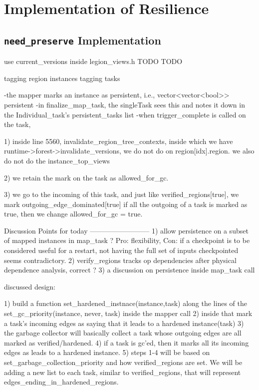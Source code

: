 \section{Implementation of Resilience}

\subsection{\texttt{need\_preserve} Implementation}

use current\_versions inside legion\_views.h TODO TODO

tagging region instances
tagging tasks

-the mapper marks an instance as persistent, i.e., vector<vector<bool>> persistent
-in finalize\_map\_task, the singleTask sees this and notes it down in the Individual\_task's persistent\_tasks list
-when trigger\_complete is called on the task, 

	1) inside line 5560, invalidate\_region\_tree\_contexts, 
		inside which we have runtime->forest->invalidate\_versions, we do not do on region[idx].region.
		we also do not do the instance\_top\_views
		
	2) we retain the mark on the task as allowed\_for\_gc.

   3) we go to the incoming of this task, and just like verified\_regions[true], we mark outgoing\_edge\_dominated[true]
      if all the outgoing of a task is marked as true, then we change allowed\_for\_gc = true.


Discussion Points for today
--------------------------
1) allow persistence on a subset of mapped instances in map\_task ? Pro:
flexibility, Con: if a checkpoint is to be considered useful for a restart, not
having the full set of inputs checkpointed seems contradictory. 
2) verify\_regions tracks op dependencies after physical dependence analysis, correct ? 
3) a discussion on persistence inside map\_task call 


discussed design:

1) build a function set\_hardened\_instnace(instance,task) along the lines of the set\_gc\_priority(instance, never, task) inside the mapper call
2) inside that mark a task's incoming edges as saying that it leads to a hardened instance(task)
3) the garbage collector will basically collect a task whose outgoing edges are all marked as verified/hardened.
4) if a task is gc'ed, then it marks all its incoming edges as leads to a hardened instance.
5) steps 1-4 will be based on set\_garbage\_collection\_priority and how verified\_regions are set. We will be adding a new list to each task, similar to verified\_regions, that will represent edges\_ending\_in\_hardened\_regions.


